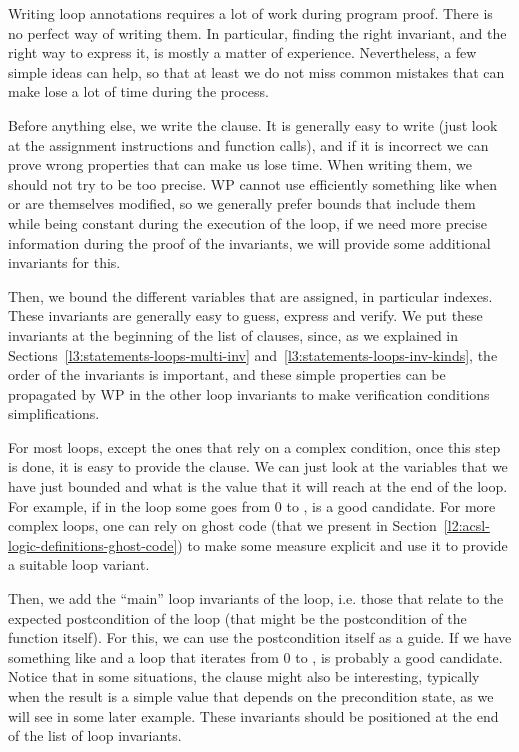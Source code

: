 

Writing loop annotations requires a lot of work during program proof. There is
no perfect way of writing them. In particular, finding the right invariant, and
the right way to express it, is mostly a matter of experience. Nevertheless, a
few simple ideas can help, so that at least we do not miss common mistakes that
can make lose a lot of time during the process.


Before anything else, we write the  clause. It is
generally easy to write (just look at the assignment instructions and function
calls), and if it is incorrect we can prove wrong properties that can make us
lose time. When writing them, we should not try to be too precise. WP cannot use
efficiently something like  when  or
 are themselves modified, so we generally prefer bounds that
include them while being constant during the execution of the loop, if we need
more precise information during the proof of the invariants, we will provide
some additional invariants for this.


Then, we bound the different variables that are assigned, in particular indexes.
These invariants are generally easy to guess, express and verify. We put these
invariants at the beginning of the list of  clauses,
since, as we explained in Sections~\ref{l3:statements-loops-multi-inv}
and~\ref{l3:statements-loops-inv-kinds}, the order of the invariants is important,
and these simple properties can be propagated by WP in the other loop invariants
to make verification conditions simplifications.


For most loops, except the ones that rely on a complex condition, once this step
is done, it is easy to provide the  clause. We can just
look at the variables that we have just bounded and what is the value that it
will reach at the end of the loop. For example, if in the loop some 
goes from 0 to ,  is a good candidate. For more
complex loops, one can rely on ghost code (that we present in
Section~\ref{l2:acsl-logic-definitions-ghost-code}) to make some measure
explicit and use it to provide a suitable loop variant.


Then, we add the ``main'' loop invariants of the loop, i.e. those that relate to
the expected postcondition of the loop (that might be the postcondition of the
function itself). For this, we can use the postcondition itself as a guide. If
we have something like  and a loop that iterates
 from 0 to ,  is
probably a good candidate. Notice that in some situations, the
 clause might also be interesting, typically when the result
is a simple value that depends on the precondition state, as we will see in some
later example. These invariants should be positioned at the end of the list of
loop invariants.


